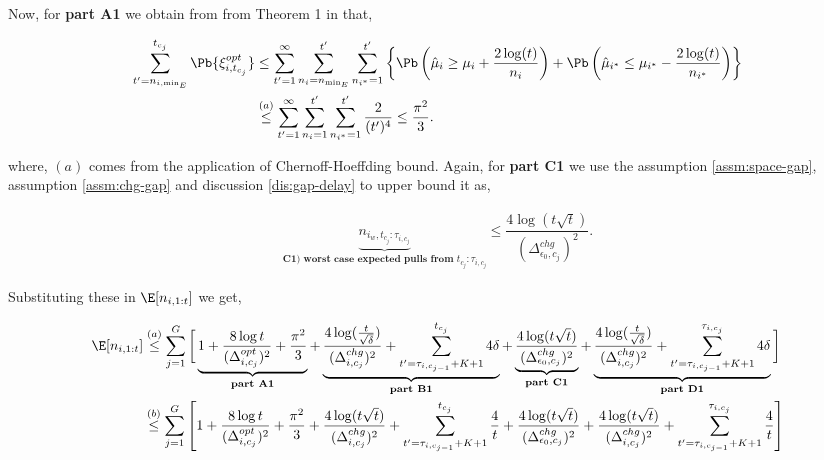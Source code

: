 \begin{customproof}{2}
Now, for \textbf{part A1} we obtain from from Theorem 1 in \citet{auer2002finite} that,

\begin{align*}
\sum_{t'=n_{i,\min_{E}}}^{t_{c_j}}\Pb\lbrace \xi^{opt}_{i,t_{c_j}} \rbrace &\leq \sum_{t'=1}^{\infty}\sum_{n_{i}=n_{\min_{E}}}^{t'}\sum_{n_{i^*}=1}^{t'}\left\lbrace \Pb\left(\hat{\mu}_{i} \geq \mu_{i} + \dfrac{2\log(t)}{n_i}\right) + \Pb\left(\hat{\mu}_{i^*} \leq \mu_{i^*}- \dfrac{2\log(t)}{n_{i^*}}\right)\right\rbrace\\
&\overset{(a)}{\leq} \sum_{t'=1}^{\infty}\sum_{n_{i}=1}^{t'}\sum_{n_{i^*}=1}^{t'}\dfrac{2}{(t')^4} \leq \dfrac{\pi^2}{3}.
\end{align*}

where, $(a)$ comes from the application of Chernoff-Hoeffding bound. Again, for \textbf{part C1} we use the assumption \ref{assm:space-gap}, assumption \ref{assm:chg-gap} and discussion \ref{dis:gap-delay} to upper bound it as,

\begin{align*}
\underbrace{n_{i_{w},t_{c_j}:\tau_{i,c_j}}}_{\textbf{C1) worst case expected pulls from $t_{c_j}:\tau_{i,c_j}$}} \leq \dfrac{4\log(t\sqrt{t})}{(\Delta^{chg}_{\epsilon_0,c_j})^{2}}.
\end{align*}

Substituting these in $\E[n_{i,1:t}]$ we get,

\begin{align*}
\E[n_{i,1:t}] &\overset{(a)}{\leq} \sum_{j=1}^{G}\bigg[\underbrace{1+ \dfrac{8\log t}{(\Delta^{opt}_{i,c_j})^2} + \dfrac{\pi^2}{3}}_{\textbf{part A1}} + \underbrace{\dfrac{4\log(\frac{t}{\sqrt{\delta}})}{(\Delta^{chg}_{i,c_j})^2} + \sum_{t'=\tau_{i,c_{j-1}}+K+1}^{t_{c_j}}4\delta}_{\textbf{part B1}} + \underbrace{\dfrac{4\log(t\sqrt{t})}{(\Delta^{chg}_{\epsilon_0,c_j})^{2}}}_{\textbf{part C1}}
+ \underbrace{\dfrac{4\log(\frac{t}{\sqrt{\delta}})}{(\Delta^{chg}_{i,c_j})^2} + \sum_{t'=\tau_{i,c_{j-1}}+K+1}^{\tau_{i,c_j}}4\delta}_{\textbf{part D1}} \bigg]\\
&\overset{(b)}{\leq} \sum_{j=1}^{G}\left[1+ \dfrac{8\log t}{(\Delta^{opt}_{i,c_j})^2} + \dfrac{\pi^2}{3} + \dfrac{4\log(t\sqrt{t})}{(\Delta^{chg}_{i,c_j})^2} + \sum_{t'=\tau_{i,c_{j-1}}+K+1}^{t_{c_j}}\dfrac{4}{t} + \dfrac{4\log(t\sqrt{t})}{(\Delta^{chg}_{\epsilon_0,c_j})^{2}} +\dfrac{4\log(t\sqrt{t})}{(\Delta^{chg}_{i,c_j})^2} + \sum_{t'=\tau_{i,c_{j-1}}+K+1}^{\tau_{i,c_j}}\dfrac{4}{t} \right]\\
\end{align*}


\end{customproof}
